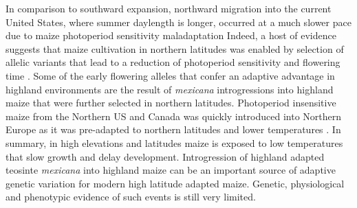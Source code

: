 \documentclass[9pt,twocolumn,twoside,lineno]{BioRxiv}
\begin{document}
In comparison to southward expansion, northward migration into the current United States, where summer daylength is longer, occurred at a much slower pace \cite{Da_Fonseca2015-zh, Swarts2017-ge} due to maize photoperiod sensitivity maladaptation \cite{Hung2012-ms}
Indeed, a host of evidence suggests that maize cultivation in northern latitudes was enabled by selection of allelic variants that lead to a reduction of photoperiod sensitivity and flowering time \cite{Liang2018-af, Guo2018-on, Coles2010-db, Huang2018-ga, Yang2013-lg, Salvi2007-ku, Hung2012-ms}.
Some of the early flowering alleles that confer an adaptive advantage in highland environments are the result of \textit{mexicana} introgressions into highland maize \cite{Guo2018-on} that were further selected in northern latitudes.
Photoperiod insensitive maize from the Northern US and Canada was quickly introduced into Northern Europe as it was pre-adapted to northern latitudes and lower temperatures \cite{Brandenburg2017-ii}.
In summary, in high elevations and latitudes maize is exposed to low temperatures that slow growth and delay development. 
Introgression of highland adapted teosinte \textit{mexicana} into highland maize can be an important source of adaptive genetic variation for modern high latitude adapted maize.
Genetic, physiological and phenotypic evidence of such events is still very limited.
\end{document}
